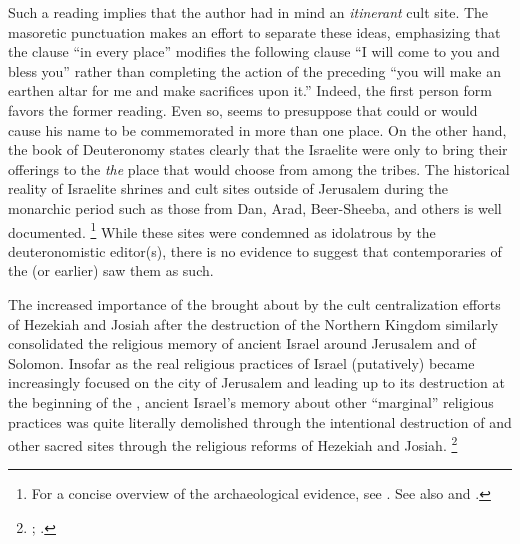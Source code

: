 Such a reading implies that the author had in mind an \emph{itinerant} cult site. The masoretic punctuation makes an effort to separate these ideas, emphasizing that the clause  ``in every place'' modifies the following clause  ``I will come to you and bless you'' rather than completing the action of the preceding  ``you will make an earthen altar for me and make sacrifices upon it.'' Indeed, the first person form  favors the former reading. Even so,  seems to presuppose that \yahweh could or would cause his name to be commemorated in more than one place. On the other hand, the book of Deuteronomy states clearly that the Israelite were only to bring their offerings to the \emph{the} place that \yahweh would choose from among the tribes. The historical reality of Israelite shrines and cult sites outside of Jerusalem during the monarchic period such as those from Dan, Arad, Beer-Sheeba, and others is well documented.%
    \footnote{For a concise overview of the archaeological evidence, see \cite[319--352]{king-stager2001}. See also \cite{edelman_barton-stavrakopoulou2010} and \cite[160--181]{smith2002}.}
While these sites were condemned as idolatrous by the deuteronomistic editor(s), there is no evidence to suggest that contemporaries of the  (or earlier) saw them as such.

The increased importance of the \jerusalemtemple brought about by the cult centralization efforts of Hezekiah and Josiah after the destruction of the Northern Kingdom similarly consolidated the religious memory of ancient Israel around Jerusalem and \temple of Solomon. Insofar as the real religious practices of Israel (putatively) became increasingly focused on the city of Jerusalem and \solomonstemple leading up to its destruction at the beginning of the , ancient Israel's memory about other ``marginal'' religious practices was quite literally demolished through the intentional destruction of  and other sacred sites through the religious reforms of Hezekiah and Josiah.%
    \footnote{\cite[182--199]{smith2002}; \cite[191--209]{romer2015}.}

